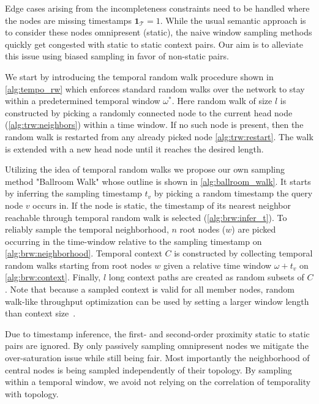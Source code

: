 Edge cases arising from the incompleteness constraints need to be handled where the nodes are missing timestamps $\mathbf{1}_{\mathcal{T}} = 1$.
While the usual semantic approach is to consider these nodes omnipresent (static), the naive window sampling methods quickly get congested with static to static context pairs.
Our aim is to alleviate this issue using biased sampling in favor of non-static pairs.

We start by introducing the temporal random walk procedure shown in \cref{alg:tempo_rw} which enforces standard random walks over the network to stay within a predetermined temporal window $\omega^*$.
Here random walk of size $l$ is constructed by picking a randomly connected node to the current head node (\cref{alg:trw:neighbors}) within a time window.
If no such node is present, then the random walk is restarted from any already picked node \cref{alg:trw:restart}.
The walk is extended with a new head node until it reaches the desired length.



Utilizing the idea of temporal random walks we propose our own sampling method "Ballroom Walk" whose outline is shown in \cref{alg:ballroom_walk}.
It starts by inferring the sampling timestamp $t_v$ by picking a random timestamp the query node $v$ occurs in.
If the node is static, the timestamp of its nearest neighbor reachable through temporal random walk is selected (\cref{alg:brw:infer_t}).
To reliably sample the temporal neighborhood, $n$ root nodes ($w$) are picked occurring in the time-window relative to the sampling timestamp on \cref{alg:brw:neighborhood}.
Temporal context $C$ is constructed by collecting temporal random walks starting from root nodes $w$ given a relative time window $\omega + t_v$ on \cref{alg:brw:context}.
Finally, $l$ long context paths are created as random subsets of $C$.
Note that because a sampled context is valid for all member nodes, random walk-like throughput optimization can be used by setting a larger window length than context size~\cite{perozziDeepWalkOnlineLearning2014}.



Due to timestamp inference, the first- and second-order proximity static to static pairs are ignored.
By only passively sampling omnipresent nodes we mitigate the over-saturation issue while still being fair.
Most importantly the neighborhood of central nodes is being sampled independently of their topology.
By sampling within a temporal window, we avoid not relying on the correlation of temporality with topology.

